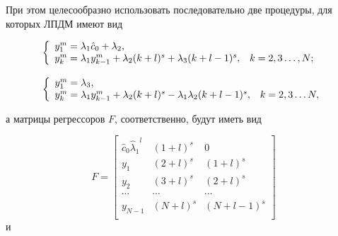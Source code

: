 
При этом целесообразно использовать последовательно две процедуры, для которых ЛПДМ имеют вид 

\begin{gather}

\label{a:eq12_2}

\left\{

 \begin{array}{ll}

 y^m_1 = \lambda_1 \hat{c}_0 + \lambda_2,\\

y^m_k = \lambda_1  y^m_{k - 1} + \lambda_2 (k + l) ^ s + \lambda_3 (k + l - 1) ^ s, & k=2, 3\dots, N;

\end{array} \right. \hspace{2mm} \\[3mm]

\label{a:eq12_3}

\left\{

\begin{array}{ll}

 y^m_1 = \lambda_3,\\

y^m_k = \lambda_1 y^m_{k - 1} + \lambda_2 (k + l) ^ s - \lambda_1 \lambda_2 (k + l - 1) ^ s, & k=2, 3\dots N,

\end{array} \right.

\end{gather}

а матрицы регрессоров $F$, соответственно, будут иметь вид 

$$

F=

 \left[\begin{array}{cccc}

 \hat{c}_0 {\hat{\lambda}_1}^l & (1+l)^s & 0\\

 y_1 & (2+l)^s & (1+l)^s\\

 y_2 & (3+l)^s & (2+l)^s\\

 \cdots & \cdots & \cdots\\

 y_{N-1} & (N+l)^s & (N+l-1)^s\\

\end{array}\right]$$ и $$

